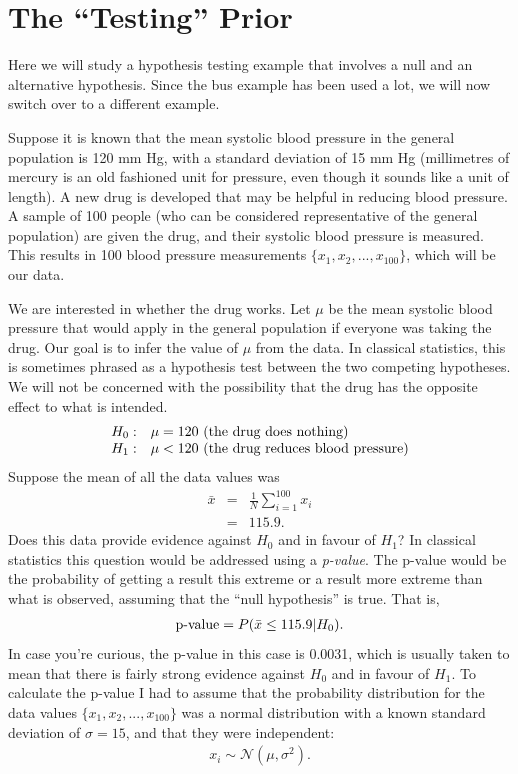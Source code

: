 \section{The ``Testing'' Prior}
Here we will study a hypothesis testing example that involves a null and an
alternative hypothesis. Since the bus example has been used a lot, we will now
switch over to a different example.

Suppose it is known that the mean systolic blood pressure
in the general population is 120 mm Hg, with a standard deviation of
15 mm Hg (millimetres of mercury is an
old fashioned unit for pressure, even though it sounds like a unit of length).
A new drug is developed that may
be helpful in reducing blood pressure. A sample of 100 people
(who can be considered representative of the general population)
are given the drug, and their systolic blood pressure is measured. This results
in 100 blood pressure measurements $\{x_1, x_2, ..., x_{100}\}$, which will be
our data.

We are interested in whether the drug works. Let $\mu$ be the mean systolic
blood pressure
that would apply in the general population if everyone was taking the
drug. Our goal is to infer the value of $\mu$ from the data. In classical
statistics, this is sometimes phrased as a hypothesis test between the two
competing hypotheses. We will not be concerned with the possibility that the
drug has the opposite effect to what is intended.
\begin{equation}
\begin{array}{ll}
H_0: & \mu = 120 \textnormal{ (the drug does nothing)}\\
H_1: & \mu < 120 \textnormal{ (the drug reduces blood pressure)}
\end{array}
\end{equation}
Suppose the mean of all the data values was
\begin{eqnarray}
\bar{x} &=& \frac{1}{N} \sum_{i=1}^{100} x_i\\
&=& 115.9.
\end{eqnarray}
Does this data provide evidence against $H_0$ and in favour of $H_1$? In
classical statistics this question would be addressed using a {\it p-value}.
The p-value would be the probability of getting a result this extreme or
a result more extreme than what is observed, assuming that the ``null hypothesis''
is true. That is,
\begin{eqnarray}
\textnormal{p-value} = P(\bar{x} \leq 115.9 | H_0).
\end{eqnarray}
In case you're curious, the p-value in this case is 0.0031, which is usually
taken to mean that there is fairly strong evidence against $H_0$ and in favour
of $H_1$. To calculate the p-value I had to assume that the probability distribution
for the data values $\{x_1, x_2, ..., x_{100}\}$ was a normal distribution
with a known standard deviation of $\sigma=15$, and
that they were independent:
\begin{eqnarray}
x_i \sim \mathcal{N}(\mu, \sigma^2). \label{eq:normal}
\end{eqnarray}

